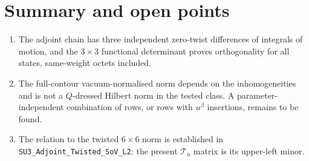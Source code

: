 \documentclass[11pt]{article}
\begin{document}
\section{Summary and open points}
\begin{enumerate}
\item The adjoint chain has three independent zero-twist differences of integrals of motion, and
the $3\times3$ functional determinant proves orthogonality for all states, same-weight octets
included.
\item The full-contour vacuum-normalised norm depends on the inhomogeneities and is not a
$Q$-dressed Hilbert norm in the tested class. A parameter-independent combination of rows, or rows
with $u^\beta$ insertions, remains to be found.
\item The relation to the twisted $6\times6$ norm is established in
\texttt{SU3\_Adjoint\_Twisted\_SoV\_L2}: the present $\mathcal T_a$ matrix is its upper-left minor.
\end{enumerate}
\end{document}
